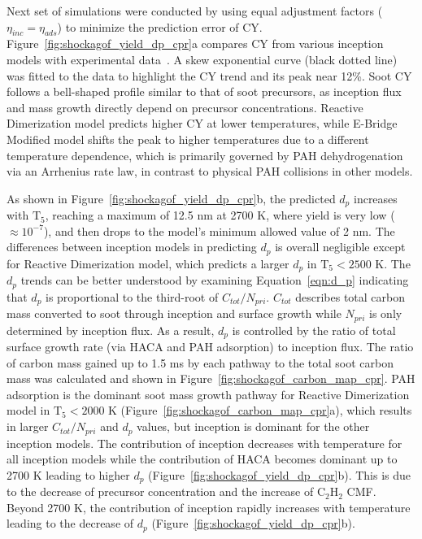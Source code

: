Next set of simulations were conducted by using equal adjustment factors ($\eta_{inc}=\eta_{ads}$) to minimize the prediction error of CY. Figure~\ref{fig:shockagof_yield_dp_cpr}a compares CY from various inception models with experimental data~\citep{agafonov2016unified}. A skew exponential curve (black dotted line) was fitted to the data to highlight the CY trend and its peak near 12\%. Soot CY follows a bell-shaped profile similar to that of soot precursors, as inception flux and mass growth directly depend on precursor concentrations. Reactive Dimerization model predicts higher CY at lower temperatures, while E-Bridge Modified model shifts the peak to higher temperatures due to a different temperature dependence, which is primarily governed by PAH dehydrogenation via an Arrhenius rate law, in contrast to physical PAH collisions in other models. 


As shown in Figure~\ref{fig:shockagof_yield_dp_cpr}b, the predicted $d_p$ increases with $\mathrm{T_5}$, reaching a maximum of 12.5 nm at 2700 K, where yield is very low ($\approx 10^{-7}$), and then drops to the model's minimum allowed value of 2 nm. The differences between inception models in predicting $d_p$ is overall negligible except for Reactive Dimerization model, which predicts a larger $d_p$ in $\mathrm{T_5}<2500$ K. The $d_p$ trends can be better understood by examining Equation~\eqref{eqn:d_p} indicating that $d_p$ is proportional to the third-root of $C_{tot}/N_{pri}$. $C_{tot}$ describes total carbon mass converted to soot through inception and surface growth while $N_{pri}$ is only determined by inception flux. As a result, $d_p$ is controlled by the ratio of total surface growth rate (via HACA and PAH adsorption) to inception flux. The ratio of carbon mass gained up to 1.5 ms by each pathway to the total soot carbon mass was calculated and shown in Figure~\ref{fig:shockagof_carbon_map_cpr}. PAH adsorption is the dominant soot mass growth pathway for Reactive Dimerization model in $\mathrm{T_5}<2000$ K (Figure~\ref{fig:shockagof_carbon_map_cpr}a), which results in larger $C_{tot}/N_{pri}$ and $d_p$ values, but inception is dominant for the other inception models. The contribution of inception decreases with temperature for all inception models while the contribution of HACA becomes dominant up to 2700 K leading to higher $d_p$ (Figure~\ref{fig:shockagof_yield_dp_cpr}b). This is due to the decrease of precursor concentration and the increase of $\mathrm{C_2H_2}$ CMF. Beyond 2700 K, the contribution of inception rapidly increases with temperature leading to the decrease of $d_p$ (Figure~\ref{fig:shockagof_yield_dp_cpr}b).


